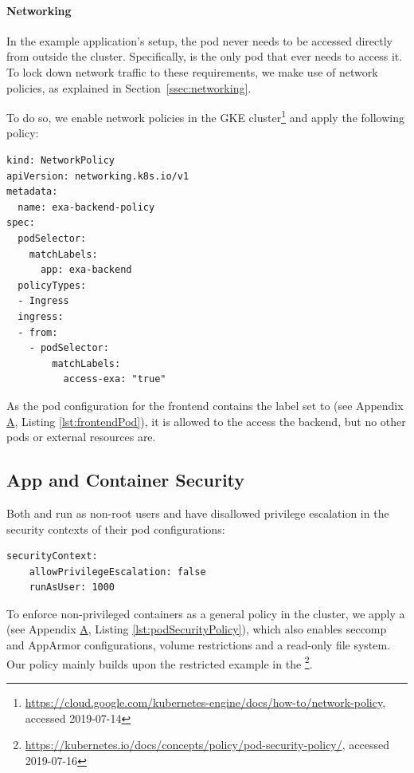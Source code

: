 \paragraph{Networking}

In the example application's setup, the pod  never needs to be accessed directly from outside the cluster. Specifically,  is the only pod that ever needs to access it. To lock down network traffic to these requirements, we make use of network policies, as explained in Section~\ref{ssec:networking}. 

To do so, we enable network policies in the \ac{GKE} cluster\footnote{\url{https://cloud.google.com/kubernetes-engine/docs/how-to/network-policy}, accessed 2019-07-14} and apply the following policy:

\begin{verbatim}
kind: NetworkPolicy
apiVersion: networking.k8s.io/v1
metadata:
  name: exa-backend-policy
spec:
  podSelector:
    matchLabels:
      app: exa-backend
  policyTypes:
  - Ingress
  ingress:
  - from:
    - podSelector:
        matchLabels:
          access-exa: "true"
\end{verbatim}

As the pod configuration for the frontend contains the label  set to  (see Appendix \hyperref[apx:A]{A}, Listing \ref{lst:frontendPod}), it is allowed to the access the backend, but no other pods or external resources are.

\subsection{App and Container Security} \label{ssec:exaLayer4}

Both  and  run as non-root users and have disallowed privilege escalation in the security contexts of their pod configurations:

\begin{verbatim}
securityContext:
    allowPrivilegeEscalation: false
    runAsUser: 1000
\end{verbatim}

To enforce non-privileged containers as a general policy in the cluster, we apply a  (see Appendix \hyperref[apx:A]{A}, Listing \ref{lst:podSecurityPolicy}), which also enables seccomp and AppArmor configurations, volume restrictions and a read-only file system. Our policy mainly builds upon the restricted example in the \textcite{k8sdocs}\footnote{\url{https://kubernetes.io/docs/concepts/policy/pod-security-policy/}, accessed 2019-07-16}.

